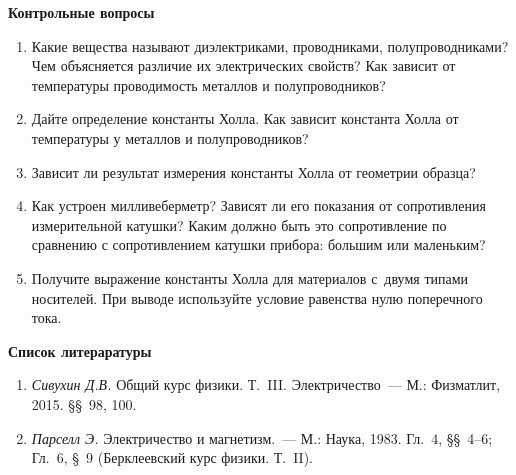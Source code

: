 {\small

{\bf \Large Контрольные вопросы}
\begin{enumerate}



\item{ Какие вещества называют диэлектриками, проводниками, полупроводниками? Чем объясняется различие их электрических свойств? Как зависит от температуры проводимость металлов и полупроводников?}

\item{ Дайте определение константы Холла. Как зависит константа Холла от температуры у металлов и полупроводников?}

\item{ Зависит ли результат измерения константы Холла от геометрии образца?}

\item{ Как устроен милливеберметр? Зависят ли его показания от сопротивления измерительной катушки? Каким должно быть это сопротивление по сравнению с сопротивлением катушки прибора: большим или маленьким?}

\item{ Получите выражение константы Холла для материалов с~двумя типами носителей. При выводе используйте условие равенства нулю поперечного тока.}

\end{enumerate}

{\bf \Large Список литераратуры}

\begin{enumerate}

\item{ \emph{Сивухин Д.В.} Общий курс физики. Т.~III. Электричество~--- М.: Физматлит, 2015. \S\S~98, 100.}

\item{ \emph{Парселл Э.} Электричество и магнетизм.~--- М.: Наука, 1983. Гл.~4, \S\S~4--6; Гл.~6, \S~9 (Берклеевский курс физики. Т.~II).}
 

\end{enumerate}
}


